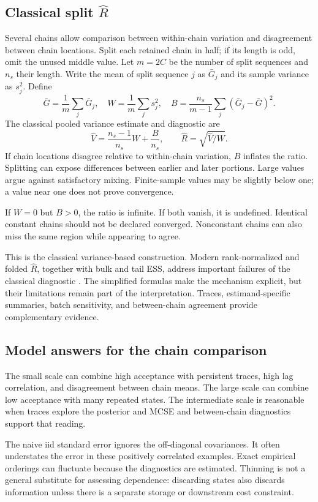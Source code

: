 \documentclass[11pt,a4paper]{article}
\begin{document}
\subsection{Classical split \texorpdfstring{$\widehat R$}{Rhat}}
Several chains allow comparison between within-chain variation and
disagreement between chain locations. Split each retained chain in half;
if its length is odd, omit the unused middle value. Let $m=2C$ be the number
of split sequences and $n_s$ their length. Write the mean of split sequence
$j$ as $\bar G_j$ and its sample variance as $s_j^2$. Define
\[
 \bar G=\frac1m\sum_j\bar G_j,\quad
 W=\frac1m\sum_js_j^2,\quad
 B=\frac{n_s}{m-1}\sum_j(\bar G_j-\bar G)^2.
\]
The classical pooled variance estimate and diagnostic are
\[
 \widehat V=\frac{n_s-1}{n_s}W+\frac B{n_s},\qquad
 \widehat R=\sqrt{\widehat V/W}.
\]
If chain locations disagree relative to within-chain variation, $B$ inflates
the ratio. Splitting can expose differences between earlier and later portions.
Large values argue against satisfactory mixing. Finite-sample values may be
slightly below one; a value near one does not prove convergence.

If $W=0$ but $B>0$, the ratio is infinite. If both vanish, it is undefined.
Identical constant chains should not be declared converged. Nonconstant chains
can also miss the same region while appearing to agree.

This is the classical variance-based construction. Modern rank-normalized and
folded $\widehat R$, together with bulk and tail ESS, address important failures
of the classical diagnostic \cite{vehtari}. The simplified formulas make the
mechanism explicit, but their limitations remain part of the interpretation.
Traces, estimand-specific summaries, batch sensitivity, and between-chain
agreement provide complementary evidence.

\subsection{Model answers for the chain comparison}
The small scale can combine high acceptance with persistent traces, high lag
correlation, and disagreement between chain means. The large scale can combine
low acceptance with many repeated states. The intermediate scale is reasonable
when traces explore the posterior and MCSE and between-chain diagnostics
support that reading.

The naive iid standard error ignores the off-diagonal covariances. It often
understates the error in these positively correlated examples. Exact empirical
orderings can fluctuate because the diagnostics are estimated. Thinning is
not a general substitute for assessing dependence: discarding states also
discards information unless there is a separate storage or downstream cost
constraint.
\end{document}
